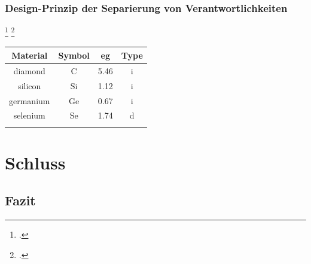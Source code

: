 \subsubsection{Design-Prinzip der Separierung von Verantwortlichkeiten}
\blindtext\footcite[Vgl. ][79]{Schelinski2019}
\blinditemize\footcite[Vgl. ][34]{Digitaloekonomie}
\Blindtext

\begin{tabular}{cccc}
    Material        & Symbol &  eg  & Type \\
    \hline
    diamond         & C      & 5.46 & i \\
    silicon         & Si     & 1.12 & i \\
    germanium       & Ge     & 0.67 & i \\
    selenium        & Se     & 1.74 & d \\
    \hline
    \captionsetup{width=.7\textwidth}
    \capquelle{\cite[][212]{bsp}}\label{tab_bsp}
\end{tabular}

\section{Schluss}
\subsection{Fazit}
\Blindtext






